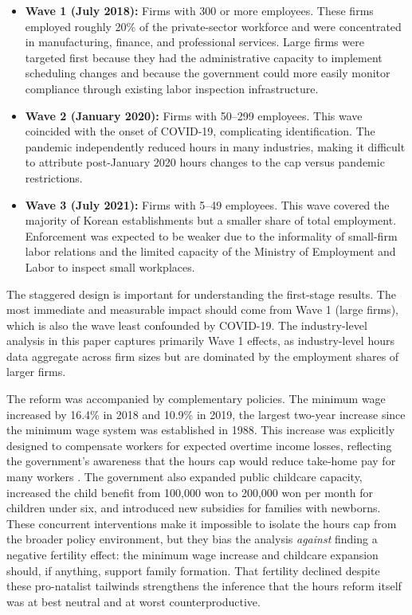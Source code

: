 \documentclass[12pt]{article}
\begin{document}
\begin{itemize}
\item \textbf{Wave 1 (July 2018):} Firms with 300 or more employees. These firms employed roughly 20\% of the private-sector workforce and were concentrated in manufacturing, finance, and professional services. Large firms were targeted first because they had the administrative capacity to implement scheduling changes and because the government could more easily monitor compliance through existing labor inspection infrastructure.
\item \textbf{Wave 2 (January 2020):} Firms with 50--299 employees. This wave coincided with the onset of COVID-19, complicating identification. The pandemic independently reduced hours in many industries, making it difficult to attribute post-January 2020 hours changes to the cap versus pandemic restrictions.
\item \textbf{Wave 3 (July 2021):} Firms with 5--49 employees. This wave covered the majority of Korean establishments but a smaller share of total employment. Enforcement was expected to be weaker due to the informality of small-firm labor relations and the limited capacity of the Ministry of Employment and Labor to inspect small workplaces.
\end{itemize}

The staggered design is important for understanding the first-stage results. The most immediate and measurable impact should come from Wave 1 (large firms), which is also the wave least confounded by COVID-19. The industry-level analysis in this paper captures primarily Wave 1 effects, as industry-level hours data aggregate across firm sizes but are dominated by the employment shares of larger firms.

The reform was accompanied by complementary policies. The minimum wage increased by 16.4\% in 2018 and 10.9\% in 2019, the largest two-year increase since the minimum wage system was established in 1988. This increase was explicitly designed to compensate workers for expected overtime income losses, reflecting the government's awareness that the hours cap would reduce take-home pay for many workers \citep{moel2018amendment}. The government also expanded public childcare capacity, increased the child benefit from 100,000 won to 200,000 won per month for children under six, and introduced new subsidies for families with newborns. These concurrent interventions make it impossible to isolate the hours cap from the broader policy environment, but they bias the analysis \textit{against} finding a negative fertility effect: the minimum wage increase and childcare expansion should, if anything, support family formation. That fertility declined despite these pro-natalist tailwinds strengthens the inference that the hours reform itself was at best neutral and at worst counterproductive.
\end{document}
